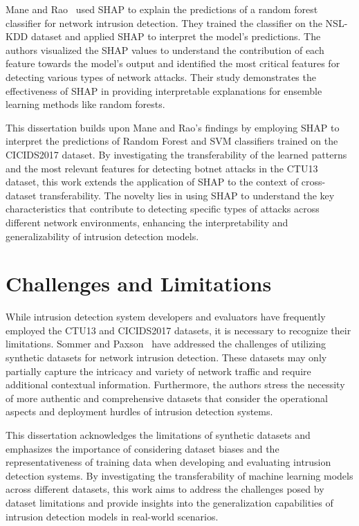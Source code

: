 Mane and Rao~\cite{mane2021explaining} used SHAP to explain the predictions of a random forest classifier for network intrusion detection. They trained the classifier on the NSL-KDD dataset and applied SHAP to interpret the model’s predictions. The authors visualized the SHAP values to understand the contribution of each feature towards the model’s output and identified the most critical features for detecting various types of network attacks. Their study demonstrates the effectiveness of SHAP in providing interpretable explanations for ensemble learning methods like random forests.

This dissertation builds upon Mane and Rao’s findings by employing SHAP to interpret the predictions of Random Forest and SVM classifiers trained on the CICIDS2017 dataset. By investigating the transferability of the learned patterns and the most relevant features for detecting botnet attacks in the CTU13 dataset, this work extends the application of SHAP to the context of cross-dataset transferability. The novelty lies in using SHAP to understand the key characteristics that contribute to detecting specific types of attacks across different network environments, enhancing the interpretability and generalizability of intrusion detection models.

\section{Challenges and Limitations}

While intrusion detection system developers and evaluators have frequently employed the CTU13 and CICIDS2017 datasets, it is necessary to recognize their limitations. Sommer and Paxson~\cite{sommer2010outside} have addressed the challenges of utilizing synthetic datasets for network intrusion detection. These datasets may only partially capture the intricacy and variety of network traffic and require additional contextual information. Furthermore, the authors stress the necessity of more authentic and comprehensive datasets that consider the operational aspects and deployment hurdles of intrusion detection systems.

This dissertation acknowledges the limitations of synthetic datasets and emphasizes the importance of considering dataset biases and the representativeness of training data when developing and evaluating intrusion detection systems. By investigating the transferability of machine learning models across different datasets, this work aims to address the challenges posed by dataset limitations and provide insights into the generalization capabilities of intrusion detection models in real-world scenarios.

